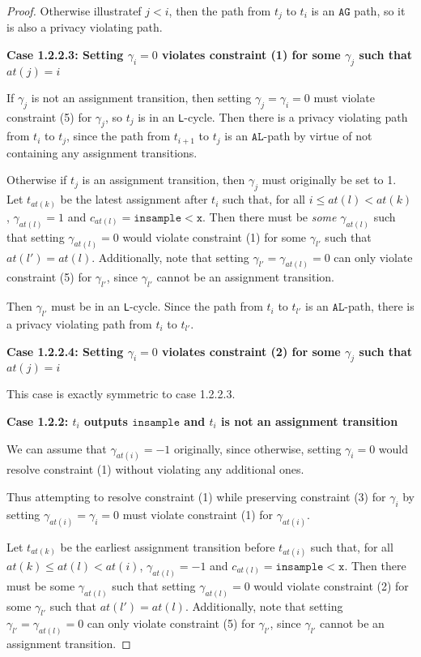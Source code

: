 \documentclass[12pt]{article}
\newcommand{\lguard}[1][x]{\texttt{insample} < #1}
\newcommand{\lcycle}{\texttt{L}-cycle}
\theoremstyle{definition}
\begin{document}
\begin{proof}
    Otherwise illustratef $j<i$, then the path from $t_j$ to $t_i$ is an $\texttt{AG}$ path, so it is also a privacy violating path.

    \textbf{Case 1.2.2.3: Setting $\gamma_i =0$ violates constraint (1) for some $\gamma_j$ such that $at(j) = i$}

    If $\gamma_j$ is not an assignment transition, then setting $\gamma_j = \gamma_i = 0$ must violate constraint (5) for $\gamma_j$, so $t_j$ is in an \lcycle. Then there is a privacy violating path from $t_i$ to $t_j$, since the path from $t_{i+1}$ to $t_j$ is an $\texttt{AL}$-path by virtue of not containing any assignment transitions. 

    Otherwise if $t_j$ is an assignment transition, then $\gamma_j$ must originally be set to 1. Let $t_{at(k)}$ be the latest assignment after $t_{i}$ such that, for all $i\leq at(l)< at(k)$, $\gamma_{at(l)} = 1$ and $c_{at(l)} = \lguard[\texttt{x}]$. Then there must be \textit{some} $\gamma_{at(l)}$ such that setting $\gamma_{at(l)} = 0$ would violate constraint (1) for some $\gamma_{l'}$ such that $at(l') = at(l)$.  
    Additionally, note that setting $\gamma_{l'} = \gamma_{at(l)} = 0$ can only violate constraint (5) for $\gamma_{l'}$, since $\gamma_{l'}$ cannot be an assignment transition. 

    Then $\gamma_{l'}$ must be in an \lcycle. Since the path from $t_i$ to $t_{l'}$ is an $\texttt{AL}$-path, there is a privacy violating path from $t_i$ to $t_{l'}$.

    \textbf{Case 1.2.2.4: Setting $\gamma_i =0$ violates constraint (2) for some $\gamma_j$ such that $at(j) = i$}

    This case is exactly symmetric to case 1.2.2.3.

    \textbf{Case 1.2.2: $t_i$ outputs $\texttt{insample}$ and $t_i$ is not an assignment transition}

    We can assume that $\gamma_{at(i)} = -1$ originally, since otherwise, setting $\gamma_i = 0$ would resolve constraint (1) without violating any additional ones.

    Thus attempting to resolve constraint (1) while preserving constraint (3) for $\gamma_i$ by setting $\gamma_{at(i)}=\gamma_i =0$ must violate constraint (1) for $\gamma_{at(i)}$. 
   
    Let $t_{at(k)}$ be the earliest assignment transition before $t_{at(i)}$ such that, for all $at(k)\leq at(l)< at(i)$, $\gamma_{at(l)} = -1$ and $c_{at(l)} = \lguard[\texttt{x}]$. Then there must be some $\gamma_{at(l)}$ such that setting $\gamma_{at(l)} = 0$ would violate constraint (2) for some $\gamma_{l'}$ such that $at(l') = at(l)$.  
    Additionally, note that setting $\gamma_{l'} = \gamma_{at(l)} = 0$ can only violate constraint (5) for $\gamma_{l'}$, since $\gamma_{l'}$ cannot be an assignment transition. 
    

\end{proof}
\end{document}
